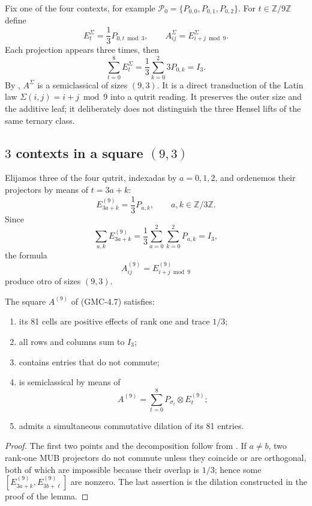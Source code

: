 Fix one of the four contexts, for example
$\mathcal P_0=\{P_{0,0},P_{0,1},P_{0,2}\}$. For $t\in\mathbb Z/9\mathbb Z$
define
\[
 E_t^{\Sigma}=\frac13P_{0,t\bmod3},
 \qquad
 A_{ij}^{\Sigma}=E_{i+j\bmod9}^{\Sigma}.
 \tag{GMC-4.5}
\]
Each projection appears three times, then
\[
 \sum_{t=0}^{8}E_t^{\Sigma}
 =\frac13\sum_{k=0}^2 3P_{0,k}=I_3.
\]
By , $A^\Sigma$ is a semiclassical \QMS of sizes
$(9,3)$. It is a direct transduction of the Latin law
$\Sigma(i,j)=i+j\bmod9$ into a qutrit reading. It preserves the outer size and
the additive leaf; it deliberately does not distinguish the three Hensel lifts of
the same ternary class.

\subsection{\(3\) contexts in a square $(9,3)$}

Elijamos three of the four \PVM qutrit, indexadas by $a=0,1,2$, and ordenemos
their projectors by means of $t=3a+k$:
\[
 E_{3a+k}^{(9)}=\frac13P_{a,k},
 \qquad a,k\in\mathbb Z/3\mathbb Z.
 \tag{GMC-4.6}
\]
Since
\[
 \sum_{a,k}E_{3a+k}^{(9)}
 =\frac13\sum_{a=0}^2\sum_{k=0}^2P_{a,k}=I_3,
\]
the formula
\[
 A_{ij}^{(9)}=E_{i+j\bmod9}^{(9)}
 \tag{GMC-4.7}
\]
produce otro \QMS of sizes $(9,3)$.

\begin{theorem}
\label{p12-83-c22-s3:gmc:thm:qms-9-3}
The square $A^{(9)}$ of \textup{(GMC-4.7)} satisfies:

\begin{enumerate}
 \item its 81 cells are positive effects of rank one and trace $1/3$;
 \item all rows and columns sum to $I_3$;
 \item contains entries that do not commute;
 \item is semiclassical by means of
 \[
 A^{(9)}=\sum_{t=0}^{8}P_{\sigma_t}\otimes E_t^{(9)};
 \tag{GMC-4.8}
 \]
 \item admits a simultaneous commutative dilation of its 81
 entries.
\end{enumerate}
\end{theorem}

\begin{proof}
The first two points and the decomposition follow from
. If $a\ne b$, two rank-one MUB projectors do not
commute unless they coincide or are orthogonal, both of which are impossible because their overlap
is $1/3$; hence some
$[E_{3a+k}^{(9)},E_{3b+\ell}^{(9)}]$ are nonzero. The last assertion is the
dilation constructed in the proof of the lemma.
\end{proof}

